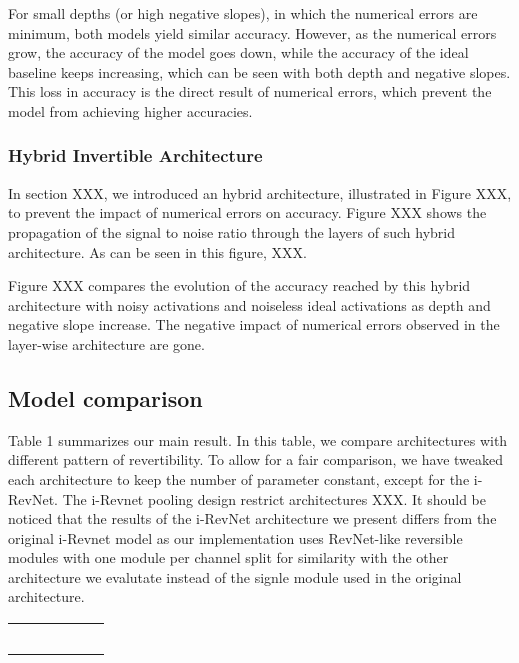 \documentclass[twocolumn]{bmcart}
\begin{document}
For small depths (or high negative slopes), in which the numerical errors are minimum, both models yield similar accuracy.
However, as the numerical errors grow, the accuracy of the model goes down, 
while the accuracy of the ideal baseline keeps increasing, 
which can be seen with both depth and negative slopes.
This loss in accuracy is the direct result of numerical errors, 
which prevent the model from achieving higher accuracies.

\subsubsection{Hybrid Invertible Architecture}

In section XXX, we introduced an hybrid architecture, 
illustrated in Figure XXX, to prevent the impact of numerical errors on accuracy.
Figure XXX shows the propagation of the signal to noise ratio through the layers of such hybrid architecture.
As can be seen in this figure, XXX.

Figure XXX compares the evolution of the accuracy reached by this hybrid architecture with noisy activations and noiseless ideal activations as depth and negative slope increase.
The negative impact of numerical errors observed in the layer-wise architecture are gone.

\subsection{Model comparison}

Table 1 summarizes our main result.
In this table, we compare architectures with different pattern of revertibility.
To allow for a fair comparison, we have tweaked each architecture to keep the number of parameter constant,
except for the i-RevNet. The i-Revnet pooling design restrict architectures XXX.
It should be noticed that the results of the i-RevNet architecture we present differs from the original i-Revnet model
as our implementation uses RevNet-like reversible modules with one module per channel split for similarity with
the other architecture we evalutate instead of the signle module used in the original architecture.

\begin{table}[t]
\begin{tabular}{ c c c | c c c}	
 &  &  &  &  & \\
 &  &  &  &  & \\
\hline			
 &  &  &  &  & \\
 &  &  &  &  & \\
 &  &  &  &  & \\
\hline
\end{tabular}
\end{table}
\end{document}
